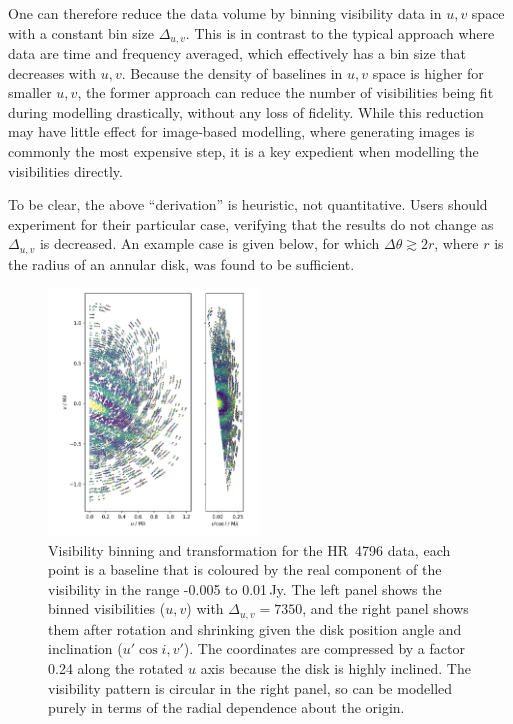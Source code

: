 \documentclass[fleqn,usenatbib]{mnras}
\begin{document}
One can therefore reduce the data volume by binning visibility data in $u,v$ space with a constant bin size $\Delta_{u,v}$. This is in contrast to the typical approach where data are time and frequency averaged, which effectively has a bin size that decreases with $u,v$. Because the density of baselines in $u,v$ space is higher for smaller $u,v$, the former approach can reduce the number of visibilities being fit during modelling drastically, without any loss of fidelity. While this reduction may have little effect for image-based modelling, where generating images is commonly the most expensive step, it is a key expedient when modelling the visibilities directly.

To be clear, the above ``derivation'' is heuristic, not quantitative. Users should experiment for their particular case, verifying that the results do not change as $\Delta_{u,v}$ is decreased. An example case is given below, for which $\Delta \theta \gtrsim 2r$, where $r$ is the radius of an annular disk, was found to be sufficient.

\begin{figure}
    \centering
    \hspace{-0.5cm}\includegraphics[width=0.5\textwidth]{vis_avg.png}
    \caption{Visibility binning and transformation for the HR~4796 data, each point is a baseline that is coloured by the real component of the visibility in the range -0.005 to 0.01\,Jy. The left panel shows the binned visibilities ($u, v$) with $\Delta_{u,v}=7350$, and the right panel shows them after rotation and shrinking given the disk position angle and inclination ($u' \cos i, v'$). The coordinates are compressed by a factor 0.24 along the rotated $u$ axis because the disk is highly inclined. The visibility pattern is circular in the right panel, so can be modelled purely in terms of the radial dependence about the origin.}
    \label{fig:bin}
\end{figure}
\end{document}
